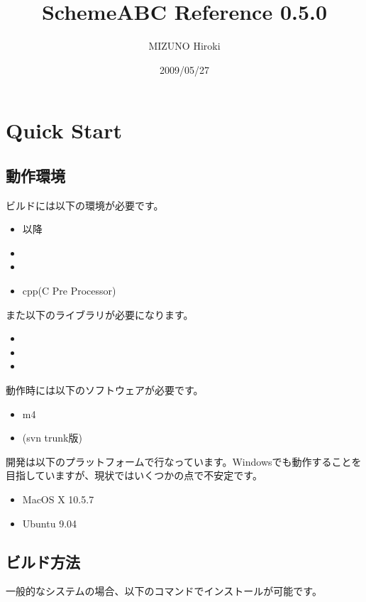 \documentclass[draft]{article}
\begin{document}
\title{SchemeABC Reference 0.5.0}
\author{MIZUNO Hiroki}
\date{2009/05/27}
\maketitle
\tableofcontents

\section{Quick Start}
\subsection{動作環境}

ビルドには以下の環境が必要です。
\begin{itemize}
\item {}以降
\item {}
\item {}
\item cpp(C Pre Processor)
\end{itemize}

また以下のライブラリが必要になります。
\begin{itemize}
\item {}
\item {}
\item {}
\end{itemize}

動作時には以下のソフトウェアが必要です。
\begin{itemize}
\item m4
\item {}(svn trunk版)
\end{itemize}

開発は以下のプラットフォームで行なっています。Windowsでも動作することを目指していますが、現状ではいくつかの点で不安定です。
\begin{itemize}
\item MacOS X 10.5.7
\item Ubuntu 9.04
\end{itemize}


\subsection{ビルド方法}
一般的なシステムの場合、以下のコマンドでインストールが可能です。
\end{document}

